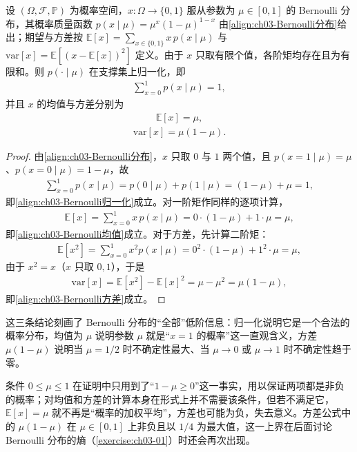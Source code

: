 \documentclass[../../main.tex]{subfiles}
\begin{document}
\begin{proposition}\label{proposition:ch03-Bernoulli矩}
设 $(\Omega,\mathcal{F},\mathbb{P})$ 为概率空间，$x:\Omega\to\{0,1\}$ 服从参数为 $\mu\in[0,1]$ 的 Bernoulli 分布，其概率质量函数 $p(x\mid\mu)=\mu^{x}(1-\mu)^{1-x}$ 由\eqref{align:ch03-Bernoulli分布}给出；期望与方差按 $\mathbb{E}[x]=\sum_{x\in\{0,1\}}x\,p(x\mid\mu)$ 与 $\mathrm{var}[x]=\mathbb{E}[(x-\mathbb{E}[x])^{2}]$ 定义。由于 $x$ 只取有限个值，各阶矩均存在且为有限和。则 $p(\cdot\mid\mu)$ 在支撑集上归一化，即
\begin{align}
\sum_{x=0}^{1}p(x\mid\mu)=1,
\label{align:ch03-Bernoulli归一化}
\end{align}
并且 $x$ 的均值与方差分别为
\begin{align}
\mathbb{E}[x]=\mu,
\label{align:ch03-Bernoulli均值}
\end{align}
\begin{align}
\mathrm{var}[x]=\mu(1-\mu).
\label{align:ch03-Bernoulli方差}
\end{align}
\end{proposition}
\begin{proof}
由\eqref{align:ch03-Bernoulli分布}，$x$ 只取 $0$ 与 $1$ 两个值，且 $p(x=1\mid\mu)=\mu$、$p(x=0\mid\mu)=1-\mu$，故
\begin{align*}
\sum_{x=0}^{1}p(x\mid\mu)=p(0\mid\mu)+p(1\mid\mu)=(1-\mu)+\mu=1,
\end{align*}
即\eqref{align:ch03-Bernoulli归一化}成立。对一阶矩作同样的逐项计算，
\begin{align*}
\mathbb{E}[x]=\sum_{x=0}^{1}x\,p(x\mid\mu)=0\cdot(1-\mu)+1\cdot\mu=\mu,
\end{align*}
即\eqref{align:ch03-Bernoulli均值}成立。对于方差，先计算二阶矩：
\begin{align*}
\mathbb{E}[x^{2}]=\sum_{x=0}^{1}x^{2}p(x\mid\mu)=0^{2}\cdot(1-\mu)+1^{2}\cdot\mu=\mu,
\end{align*}
由于 $x^{2}=x$（$x$ 只取 $0,1$），于是
\begin{align*}
\mathrm{var}[x]=\mathbb{E}[x^{2}]-\mathbb{E}[x]^{2}=\mu-\mu^{2}=\mu(1-\mu),
\end{align*}
即\eqref{align:ch03-Bernoulli方差}成立。
\end{proof}

\begin{remark}
这三条结论刻画了 Bernoulli 分布的“全部”低阶信息：归一化说明它是一个合法的概率分布，均值为 $\mu$ 说明参数 $\mu$ 就是“$x=1$ 的概率”这一直观含义，方差 $\mu(1-\mu)$ 说明当 $\mu=1/2$ 时不确定性最大、当 $\mu\to0$ 或 $\mu\to1$ 时不确定性趋于零。

条件 $0\leqslant\mu\leqslant1$ 在证明中只用到了“$1-\mu\geqslant0$”这一事实，用以保证两项都是非负的概率；对均值和方差的计算本身在形式上并不需要该条件，但若不满足它，$\mathbb{E}[x]=\mu$ 就不再是“概率的加权平均”，方差也可能为负，失去意义。方差公式中的 $\mu(1-\mu)$ 在 $\mu\in[0,1]$ 上非负且以 $1/4$ 为最大值，这一上界在后面讨论 Bernoulli 分布的熵（\cref{exercise:ch03-01}）时还会再次出现。
\end{remark}
\end{document}
